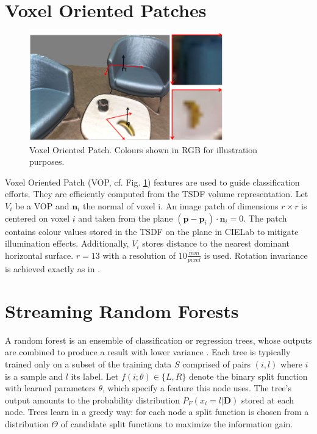 \documentclass{llncs}
\begin{document}
\section{Voxel Oriented Patches}

\begin{figure}
 \center
 \includegraphics[width=0.75\textwidth]{figures/vop}
 \caption{Voxel Oriented Patch. Colours shown in RGB for illustration purposes.}
 \label{fig:vop}
\end{figure}

  Voxel Oriented Patch (VOP, cf. Fig. \ref{fig:vop}) features are used to guide classification efforts. They are efficiently computed from the TSDF volume representation. Let $V_i$ be a VOP and $\mathbf{n}_i$ the normal of voxel i. An image patch of dimensions $r \times r$  is centered on voxel $i$ and taken from the plane $(\mathbf{p} - \mathbf{p}_i) \cdot \mathbf{n}_i = 0$. The patch contains colour values stored in the TSDF on the plane in CIELab to mitigate illumination effects. Additionally, $V_i$ stores distance to the nearest dominant horizontal surface. $r = 13$ with a resolution of $10\frac{mm}{pixel}$ is used. Rotation invariance is achieved exactly as in \cite{sift}.

\section{Streaming Random Forests}
  
  A random forest is an ensemble of classification or regression trees, whose outputs are combined to produce a result with lower variance \cite{online_forest}. Each tree is typically trained only on a subset of the training data $S$ comprised of pairs $(i, l)$ where $i$ is a sample and $l$ its label.  Let $f(i; \theta) \in \{L, R\}$ denote the binary split function with learned parameters $\theta$, which specify a feature this node uses. The tree's output amounts to the probability distribution $P_F(x_i = l | \mathbf{D})$ stored at each node. Trees learn in a greedy way: for each node a split function is chosen from a distribution $\Theta$ of candidate split functions to maximize the information gain. 
  
\end{document}
